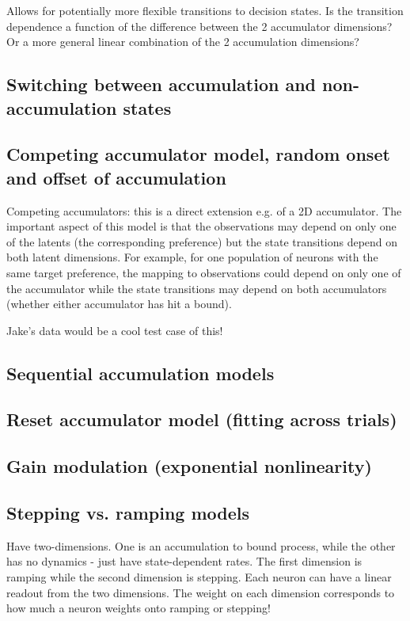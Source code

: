 \documentclass{article}
\begin{document}
Allows for potentially more flexible transitions to decision states. Is the transition dependence a function of the difference between the 2 accumulator dimensions? Or a more general linear combination of the 2 accumulation dimensions? 

\subsection{Switching between accumulation and non-accumulation states}


\subsection{Competing accumulator model, random onset and offset of accumulation}
Competing accumulators: this is a direct extension e.g. of a 2D accumulator. The important aspect of this model is that the observations may depend on only one of the latents (the corresponding preference) but the state transitions depend on both latent dimensions. For example, for one population of neurons with the same target preference, the mapping to observations could depend on only one of the accumulator while the state transitions may depend on both accumulators (whether either accumulator has hit a bound). 

Jake's data would be a cool test case of this!

\subsection{Sequential accumulation models}

\subsection{Reset accumulator model (fitting across trials)}

\subsection{Gain modulation (exponential nonlinearity)}

\subsection{Stepping vs. ramping models}
Have two-dimensions. One is an accumulation to bound process, while the other has no dynamics - just have state-dependent rates. The first dimension is ramping while the second dimension is stepping. Each neuron can have a linear readout from the two dimensions. The weight on each dimension corresponds to how much a neuron weights onto ramping or stepping! 
\end{document}
